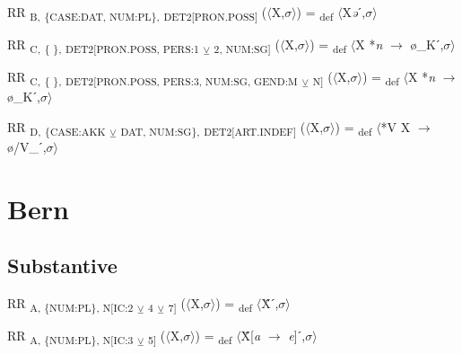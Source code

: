 {\begin{exe}
 RR \textsubscript{B,} \textsubscript{\{CASE:DAT, NUM:PL\},} \textsubscript{DET2[PRON.POSS]} ($\langle$X,$\sigma $$\rangle$) = \textsubscript{def} $\langle$X\textit{ə}ˊ,$\sigma $$\rangle$
\end{exe}

\begin{exe}
 RR \textsubscript{C,} \textsubscript{\{ \},} \textsubscript{DET2[PRON.POSS, PERS:1} \textsubscript{${\veebar}$}\textsubscript{ 2, NUM:SG]} ($\langle$X,$\sigma $$\rangle$) = \textsubscript{def} $\langle$X *\textit{n} $\rightarrow$ ø\_Kˊ,$\sigma $$\rangle$
\end{exe}

\begin{exe}
 RR \textsubscript{C,} \textsubscript{\{ \},} \textsubscript{DET2[PRON.POSS, PERS:3, NUM:SG, GEND:M} \textsubscript{${\veebar}$}\textsubscript{ N]} ($\langle$X,$\sigma $$\rangle$) = \textsubscript{def} $\langle$X *\textit{n} $\rightarrow$ \mbox{ø\_Kˊ,$\sigma $$\rangle$}
\end{exe}

\begin{exe}
 RR \textsubscript{D,} \textsubscript{\{CASE:AKK} \textsubscript{${\veebar}$}\textsubscript{ DAT, NUM:SG\},} \textsubscript{DET2[ART.INDEF]} ($\langle$X,$\sigma $$\rangle$) = \textsubscript{def} $\langle$*V X $\rightarrow$ ø/V\_ˊ,$\sigma $$\rangle$
\end{exe}

\section{Bern}

\subsection{Substantive}

\begin{exe}
 RR \textsubscript{A, \{NUM:PL\}, N[IC:2} \textsubscript{${\veebar}$}\textsubscript{ 4} \textsubscript{${\veebar}$}\textsubscript{ 7]} ($\langle$X,$\sigma $$\rangle$) = \textsubscript{def} $\langle$Ẍˊ,$\sigma $$\rangle$
\end{exe}

\begin{exe}
 RR \textsubscript{A, \{NUM:PL\}, N[IC:3} \textsubscript{${\veebar}$}\textsubscript{ 5]} ($\langle$X,$\sigma $$\rangle$) = \textsubscript{def} $\langle$Ẍ[\textit{a} $\rightarrow$ \textit{e}]ˊ,$\sigma $$\rangle$
\end{exe}

}
